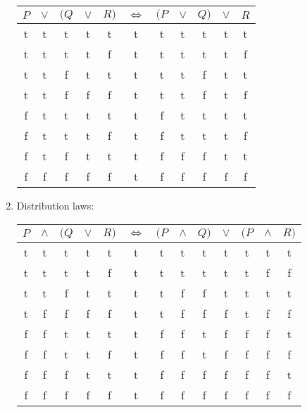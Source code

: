 \documentclass[leqno]{article}
\renewcommand{\iff}{\Leftrightarrow}
\begin{document}
\begin{enumerate}
\begin{tabular}{ccccccccccc}
  \hline
  $P$ & $\lor$ & $(Q$ & $\lor$ & $R)$ & $\iff$ & $(P$ & $\lor$ & $Q)$ & $\lor$ & $R$ \\
  \hline
   t  &    t   &   t  &    t   &  t   &   t    &   t  &   t    &  t   &   t    &  t  \\
   t  &    t   &   t  &    t   &  f   &   t    &   t  &   t    &  t   &   t    &  f  \\
   t  &    t   &   f  &    t   &  t   &   t    &   t  &   t    &  f   &   t    &  t  \\
   t  &    t   &   f  &    f   &  f   &   t    &   t  &   t    &  f   &   t    &  f  \\
   f  &    t   &   t  &    t   &  t   &   t    &   f  &   t    &  t   &   t    &  t  \\
   f  &    t   &   t  &    t   &  f   &   t    &   f  &   t    &  t   &   t    &  f  \\
   f  &    t   &   f  &    t   &  t   &   t    &   f  &   f    &  f   &   t    &  t  \\
   f  &    f   &   f  &    f   &  f   &   t    &   f  &   f    &  f   &   f    &  f  \\
  \hline
\end{tabular}

\item Distribution laws:

\begin{tabular}{ccccccccccccc}
  \hline
  $P$ & $\land$ & $(Q$ & $\lor$ & $R)$ & $\iff$ & $(P$ & $\land$ & $Q)$ & $\lor$ & $(P$ & $\land$ & $R)$ \\
  \hline
   t  &    t    &   t  &    t   &  t   &    t   &   t  &    t    &  t   &    t   &   t  &    t    &  t   \\
   t  &    t    &   t  &    t   &  f   &    t   &   t  &    t    &  t   &    t   &   t  &    f    &  f   \\
   t  &    t    &   f  &    t   &  t   &    t   &   t  &    f    &  f   &    t   &   t  &    t    &  t   \\
   t  &    f    &   f  &    f   &  f   &    t   &   t  &    f    &  f   &    f   &   t  &    f    &  f   \\
   f  &    f    &   t  &    t   &  t   &    t   &   f  &    f    &  t   &    f   &   f  &    f    &  t   \\
   f  &    f    &   t  &    t   &  f   &    t   &   f  &    f    &  t   &    f   &   f  &    f    &  f   \\
   f  &    f    &   f  &    t   &  t   &    t   &   f  &    f    &  f   &    f   &   f  &    f    &  t   \\
   f  &    f    &   f  &    f   &  f   &    t   &   f  &    f    &  f   &    f   &   f  &    f    &  f   \\
  \hline
\end{tabular}


\end{enumerate}
\end{document}
